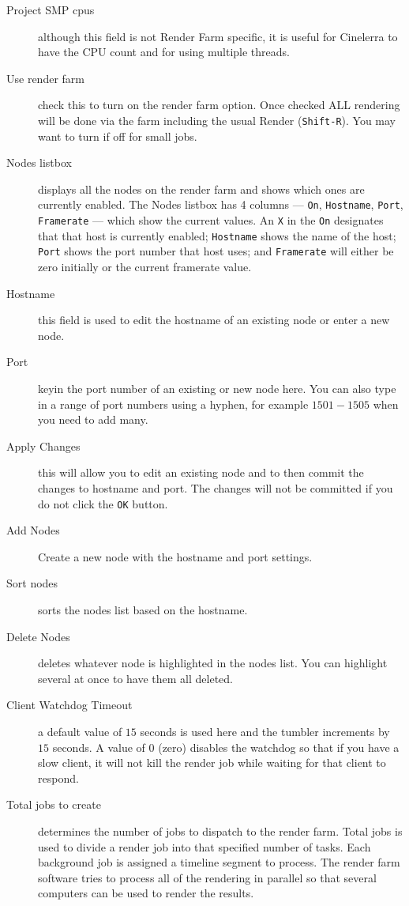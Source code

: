 \begin{description}
    \item[Project SMP cpus] although this field is not Render Farm specific, it is useful for Cinelerra to have the CPU count and for using multiple threads.
    \item[Use render farm] check this to turn on the render farm option.  Once checked ALL rendering will be done via the farm including the usual Render (\texttt{Shift-R}).  You may want to turn if off for small jobs.
    \item[Nodes listbox] displays all the nodes on the render farm and shows which ones are currently enabled. The Nodes listbox has 4 columns --- \texttt{On},  \texttt{Hostname},  \texttt{Port},  \texttt{Framerate} --- which show the current values.  An \texttt{X} in the \texttt{On} designates that that host is currently enabled; \texttt{Hostname} shows the name of the host; \texttt{Port} shows the port number that host uses; and \texttt{Framerate} will either be zero initially or the current framerate value.
    \item[Hostname] this field is used to edit the hostname of an existing node or enter a new node.
    \item[Port] keyin the port number of an existing or new node here.  You can also type in a range of port numbers using a hyphen, for example $1501-1505$ when you need to add many.
    \item[Apply Changes] this will allow you to edit an existing node and to then commit the changes to hostname and port. The changes will not be committed if you do not click the \texttt{OK} button.
    \item[Add Nodes] Create a new node with the hostname and port settings.
    \item[Sort nodes] sorts the nodes list based on the hostname.
    \item[Delete Nodes] deletes whatever node is highlighted in the nodes list.  You can highlight several at once to have them all deleted.
    \item[Client Watchdog Timeout] a default value of $15$ seconds is used here and the tumbler increments by $15$ seconds.  A value of $0$ (zero) disables the watchdog so that if you have a slow client, it will not kill the render job while waiting for that client to respond.
    \item[Total jobs to create] determines the number of jobs to dispatch to the render farm.  Total jobs is used to divide a render job into that specified number of tasks.  Each background job is assigned a timeline segment to process.  The render farm software tries to process all of the rendering in parallel so that several computers can be used to render the results.  
    

\end{description}
